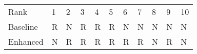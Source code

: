 \begin{tabular}{lllllllllll}
Rank & 1 & 2 & 3 & 4 & 5 & 6 & 7 & 8 & 9 & 10 \\
Baseline & R & N & R & R & R & N & N & N & N & N \\
Enhanced & N & R & R & R & R & R & R & N & R & N \\
\end{tabular}

